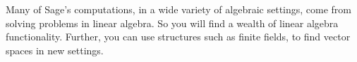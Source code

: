 Many of Sage's computations, in a wide variety of algebraic settings, come from solving problems in linear algebra.  So you will find a wealth of linear algebra functionality.  Further, you can use structures such as finite fields, to find vector spaces in new settings.